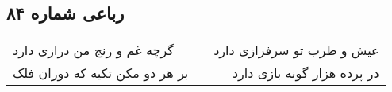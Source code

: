 \begin{center}
\section*{رباعی شماره ۸۴}
\label{sec:sh084}
\begin{longtable}{l p{0.5cm} r}
گرچه غم و رنج من درازی دارد
&&
عیش و طرب تو سرفرازی دارد
\\
بر هر دو مکن تکیه که دوران فلک
&&
در پرده هزار گونه بازی دارد
\\
\end{longtable}
\end{center}
